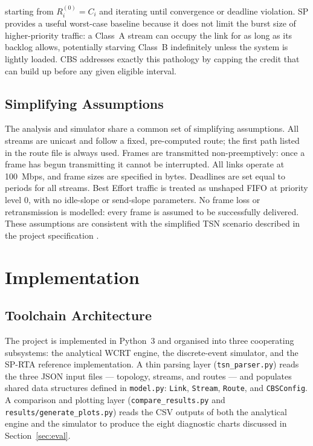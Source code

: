 \documentclass[11pt,a4paper]{article}
\begin{document}
starting from $R_i^{(0)} = C_i$ and iterating until convergence or deadline
violation.
SP provides a useful worst-case baseline because it does not limit the burst
size of higher-priority traffic: a Class~A stream can occupy the link for as
long as its backlog allows, potentially starving Class~B indefinitely unless
the system is lightly loaded.
CBS addresses exactly this pathology by capping the credit that can build up
before any given eligible interval.

\subsection{Simplifying Assumptions}

The analysis and simulator share a common set of simplifying assumptions.
All streams are unicast and follow a fixed, pre-computed route; the first
path listed in the route file is always used.
Frames are transmitted non-preemptively: once a frame has begun transmitting
it cannot be interrupted.
All links operate at 100~Mbps, and frame sizes are specified in bytes.
Deadlines are set equal to periods for all streams.
Best Effort traffic is treated as unshaped FIFO at priority level 0,
with no idle-slope or send-slope parameters.
No frame loss or retransmission is modelled: every frame is assumed to be
successfully delivered.
These assumptions are consistent with the simplified TSN scenario described
in the project specification \cite{proj}.

\section{Implementation}

\subsection{Toolchain Architecture}

The project is implemented in Python~3 and organised into three cooperating
subsystems: the analytical WCRT engine, the discrete-event simulator, and the
SP-RTA reference implementation.
A thin parsing layer (\texttt{tsn\_parser.py}) reads the three JSON input files
--- topology, streams, and routes --- and populates shared data structures
defined in \texttt{model.py}: \texttt{Link}, \texttt{Stream}, \texttt{Route},
and \texttt{CBSConfig}.
A comparison and plotting layer (\texttt{compare\_results.py} and
\texttt{results/generate\_plots.py}) reads the CSV outputs of both the
analytical engine and the simulator to produce the eight diagnostic charts
discussed in Section~\ref{sec:eval}.
\end{document}
